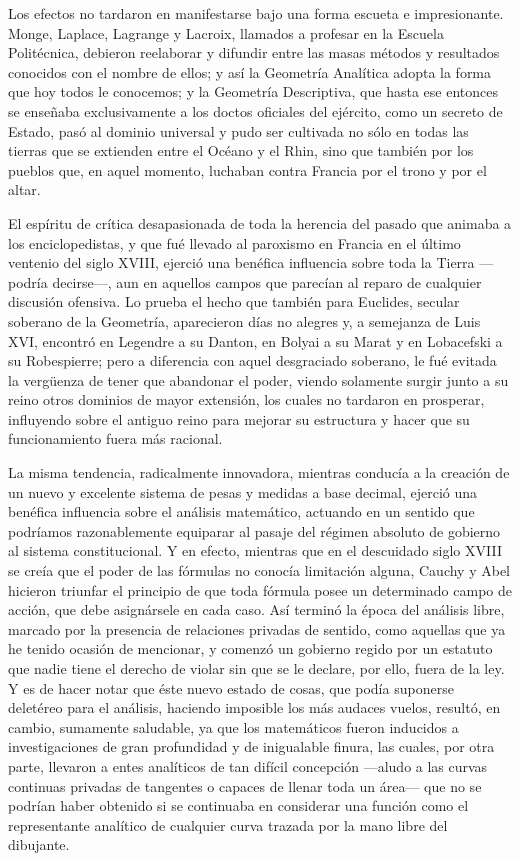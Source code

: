 \documentclass[a4paper, 12pt, draft]{article}
\begin{document}
{{Los efectos no tardaron en manifestarse bajo una forma escueta e impresionante. Monge, Laplace, Lagrange y Lacroix, llamados a profesar en la Escuela Politécnica, debieron reelaborar y difundir entre las masas métodos y resultados conocidos con el nombre de ellos; y así la Geometría Analítica adopta la forma que hoy todos le conocemos; y la Geometría Descriptiva, que hasta ese entonces se enseñaba exclusivamente a los doctos oficiales del ejército, como un secreto de Estado, pasó al dominio universal y pudo ser cultivada no sólo en todas las tierras que se extienden entre el Océano y el Rhin, sino que también por los pueblos que, en aquel momento, luchaban contra Francia por el trono y por el altar.


El espíritu de crítica desapasionada de toda la herencia del pasado que animaba a los enciclopedistas, y que fué llevado al paroxismo en Francia en el último ventenio del siglo XVIII, ejerció una benéfica influencia sobre toda la Tierra ---podría decirse---, aun en aquellos campos que parecían al reparo de cualquier discusión ofensiva. Lo prueba el hecho que también para Euclides, secular soberano de la Geometría, aparecieron días no alegres y, a semejanza de Luis XVI, encontró en Legendre a su Danton, en Bolyai a su Marat y en Lobacefski a su Robespierre; pero a diferencia con aquel desgraciado soberano, le fué evitada la vergüenza de tener que abandonar el poder, viendo solamente surgir junto a su reino otros dominios de mayor extensión, los cuales no tardaron en prosperar, influyendo sobre el antiguo reino para mejorar su estructura y hacer que su funcionamiento fuera más racional.

La misma tendencia, radicalmente innovadora, mientras conducía a la creación de un nuevo y excelente sistema de pesas y medidas a base decimal, ejerció una benéfica influencia sobre el análisis matemático, actuando en un sentido que podríamos razonablemente equiparar al pasaje del régimen absoluto de gobierno al sistema constitucional. Y en efecto, mientras que en el descuidado siglo XVIII se creía que el poder de las fórmulas no conocía limitación alguna, Cauchy y Abel hicieron triunfar el principio de que toda fórmula posee un determinado campo de acción, que debe asignársele en cada caso. Así terminó la época del análisis libre, marcado por la presencia de relaciones privadas de sentido, como aquellas que ya he tenido ocasión de mencionar, y comenzó un gobierno regido por un estatuto que nadie tiene el derecho de violar sin que se le declare, por ello, fuera de la ley. Y es de hacer notar que éste nuevo estado de cosas, que podía suponerse deletéreo para el análisis, haciendo imposible los más audaces vuelos, resultó, en cambio, sumamente saludable, ya que los matemáticos fueron inducidos a investigaciones de gran profundidad y de inigualable finura, las cuales, por otra parte, llevaron a entes analíticos de tan difícil concepción ---aludo a las curvas continuas privadas de tangentes o capaces de llenar toda un área--- que no se podrían haber obtenido si se continuaba en considerar una función como el representante analítico de cualquier curva trazada por la mano libre del dibujante.


}}
\end{document}
